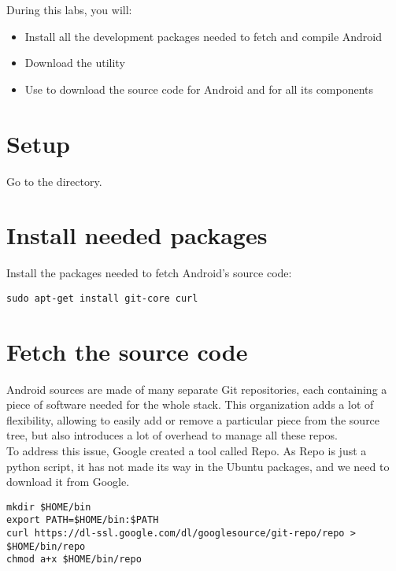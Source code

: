 
During this labs, you will:
\begin{itemize}
  \item Install all the development packages needed to fetch and compile Android
  \item Download the  utility
  \item Use  to download the source code for Android
        and for all its components 
\end{itemize}

\section{Setup}

Go to the  directory.

\section{Install needed packages}

Install the packages needed to fetch Android's source code:

\begin{verbatim}
sudo apt-get install git-core curl
\end{verbatim}

\section{Fetch the source code}

Android sources are made of many separate Git repositories, each containing a piece
of software needed for the whole stack. This organization adds a lot of
flexibility, allowing to easily add or remove a particular piece from the source
tree, but also introduces a lot of overhead to manage all these repos.\\

To address this issue, Google created a tool called Repo. As Repo is just a
python script, it has not made its way in the Ubuntu packages, and we need to
download it from Google.\\

\begin{verbatim}
mkdir $HOME/bin
export PATH=$HOME/bin:$PATH
curl https://dl-ssl.google.com/dl/googlesource/git-repo/repo > $HOME/bin/repo
chmod a+x $HOME/bin/repo
\end{verbatim}

